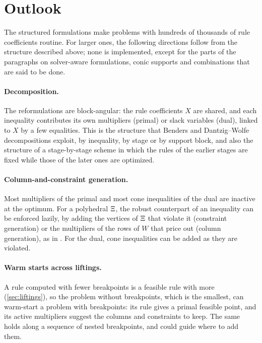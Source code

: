 \section{Outlook}
\label{sec:outlook}

The structured formulations make problems with hundreds of thousands of rule coefficients routine.
For larger ones, the following directions follow from the structure described above; none is implemented,
except for the parts of the paragraphs on solver-aware formulations, conic supports and combinations that are said to be done.

\paragraph{Decomposition.}
The reformulations are block-angular:
the rule coefficients $X$ are shared, and each inequality contributes its own multipliers (primal) or slack variables (dual), linked to $X$ by a few equalities.
This is the structure that Benders and Dantzig--Wolfe decompositions exploit, by inequality, by stage or by support block,
and also the structure of a stage-by-stage scheme in which the rules of the earlier stages are fixed while those of the later ones are optimized.

\paragraph{Column-and-constraint generation.}
Most multipliers of the primal and most cone inequalities of the dual are inactive at the optimum.
For a polyhedral $\Xi$, the robust counterpart of an inequality can be enforced lazily,
by adding the vertices of $\Xi$ that violate it (constraint generation)
or the multipliers of the rows of $W$ that price out (column generation), as in \citet{ZengZhao2013}.
For the dual, cone inequalities can be added as they are violated.

\paragraph{Warm starts across liftings.}
A rule computed with fewer breakpoints is a feasible rule with more (\cref{sec:liftings}),
so the problem without breakpoints, which is the smallest, can warm-start a problem with breakpoints:
its rule gives a primal feasible point, and its active multipliers suggest the columns and constraints to keep.
The same holds along a sequence of nested breakpoints, and could guide where to add them.

